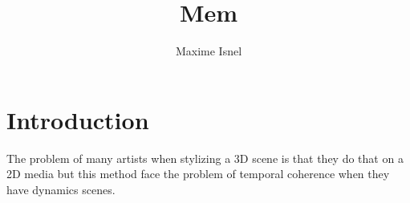 \documentclass[12pt]{article}
\title{Mem}
\author{Maxime Isnel}
\begin{document}
\maketitle

\section{Introduction}

The problem of many artists when stylizing a 3D scene is that they do that on a 2D media but this method face the problem of temporal coherence when they have dynamics scenes.
\end{document}
